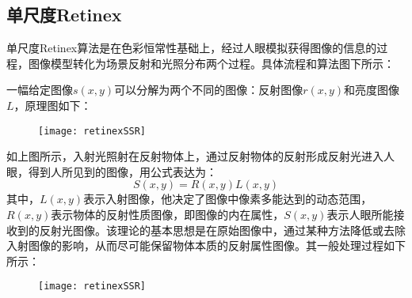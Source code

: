 				\subsection{单尺度Retinex}单尺度Retinex算法是在色彩恒常性基础上，经过人眼模拟获得图像的信息的过程，图像模型转化为场景反射和光照分布两个过程。具体流程和算法图下所示：

一幅给定图像$s(x,y)$可以分解为两个不同的图像：反射图像$r(x,y)$和亮度图像$L$，原理图如下：

\begin{figure}[!htbp]
    \centering
    \texttt{[image: retinexSSR]}
    \label{fig:tc_q_criteria}
\end{figure}


如上图所示，入射光照射在反射物体上，通过反射物体的反射形成反射光进入人眼，得到人所见到的图像，用公式表达为：
\begin{equation}     S(x,y)=R(x,y)L(x,y)    \end{equation}	
其中，$L(x,y)$表示入射图像，他决定了图像中像素多能达到的动态范围，$R(x,y)$表示物体的反射性质图像，即图像的内在属性，$S(x,y)$表示人眼所能接收到的反射光图像。该理论的基本思想是在原始图像中，通过某种方法降低或去除入射图像的影响，从而尽可能保留物体本质的反射属性图像。其一般处理过程如下所示：


\begin{figure}[!htbp]
    \centering
    \texttt{[image: retinexSSR]}
    \label{fig:tc_q_criteria}
\end{figure}


